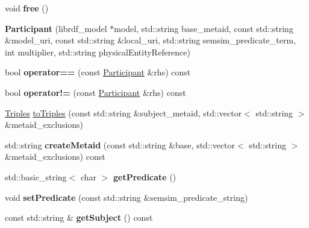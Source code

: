 \begin{DoxyCompactItemize}
void {\bfseries free} ()
\item 
\mbox{\label{classomexmeta_1_1Participant_a95c8c86650d1b0d31bb47eb618ff81b9}} 
{\bfseries Participant} (librdf\+\_\+model $\ast$model, std\+::string base\+\_\+metaid, const std\+::string \&model\+\_\+uri, const std\+::string \&local\+\_\+uri, std\+::string semsim\+\_\+predicate\+\_\+term, int multiplier, std\+::string physical\+Entity\+Reference)
\item 
\mbox{\label{classomexmeta_1_1Participant_ad3db317039b403fdb7728885152cbeda}} 
bool {\bfseries operator==} (const \hyperlink{classomexmeta_1_1Participant}{Participant} \&rhs) const
\item 
\mbox{\label{classomexmeta_1_1Participant_aa4baa62cb4ccffe8443262382490328d}} 
bool {\bfseries operator!=} (const \hyperlink{classomexmeta_1_1Participant}{Participant} \&rhs) const
\item 
\hyperlink{classomexmeta_1_1Triples}{Triples} \hyperlink{classomexmeta_1_1Participant_a6757eea8a56972eb369e0e102ae5bfc8}{to\+Triples} (const std\+::string \&subject\+\_\+metaid, std\+::vector$<$ std\+::string $>$ \&metaid\+\_\+exclusions)
\item 
\mbox{\label{classomexmeta_1_1Participant_a03a1ffc7e9efaed5c0e94a62f7c72650}} 
std\+::string {\bfseries create\+Metaid} (const std\+::string \&base, std\+::vector$<$ std\+::string $>$ \&metaid\+\_\+exclusions) const
\item 
\mbox{\label{classomexmeta_1_1Participant_aa09f8c5736dd172b03d7898519d9478d}} 
std\+::basic\+\_\+string$<$ char $>$ {\bfseries get\+Predicate} ()
\item 
\mbox{\label{classomexmeta_1_1Participant_a1188d6a2036514eb6b649ce1e08eca4d}} 
void {\bfseries set\+Predicate} (const std\+::string \&semsim\+\_\+predicate\+\_\+string)
\item 
\mbox{\label{classomexmeta_1_1Participant_a232d2e7fe124ee13650d666fdfc3b866}} 
const std\+::string \& {\bfseries get\+Subject} () const
\item 
\mbox{\label{classomexmeta_1_1Participant_ac7121064734a05141a57f39dce10e71a}} 

\end{DoxyCompactItemize}
